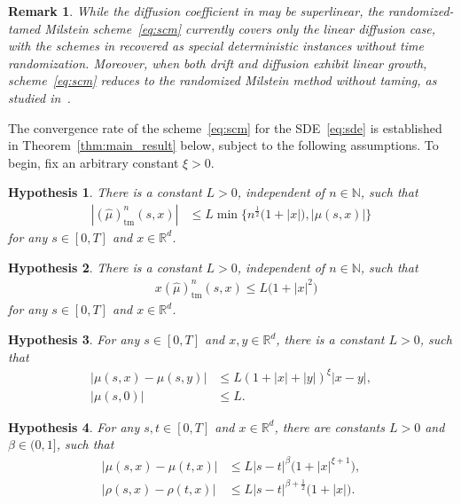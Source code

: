 \documentclass[reqno,  oneside, 12pt]{amsart}
\newtheorem{remark}{Remark}[section]
\newtheorem{asump}{Hypothesis}[section]
\begin{document}
\begin{remark}
	\sloppy
		While the diffusion coefficient in \cite{Kumar2020} may be superlinear, the randomized-tamed Milstein scheme~\eqref{eq:scm} currently covers only the linear diffusion case, with the schemes in \cite{Kumar2020} recovered as special deterministic instances without time randomization.
		Moreover, when both drift and diffusion exhibit linear growth, scheme~\eqref{eq:scm} reduces to the randomized Milstein method without taming, as studied in~\cite{Verena2024}.
\end{remark}




The convergence rate of the scheme~\eqref{eq:scm} for the SDE~\eqref{eq:sde} is established in Theorem~\ref{thm:main_result} below, subject to the following assumptions. To begin, fix an arbitrary constant $\xi > 0$.


\begin{asump} \label{asum:tame}
	There is
	a constant $L>0$, independent of $n\in\mathbb N$, such that 
	\begin{align*}
		|(\widehat{\mu})_{\mathrm{tm}}^{n}(s,x)|&\leq   L \min\big\{n^{\frac{1}{2}}\big(1+|x|\big),|\mu(s,x)|\big\}
	\end{align*}
	for any  $s\in[0,T]$ and $x\in\mathbb R^d$.
\end{asump}

\begin{asump} \label{asum:coercivity_scm}
	There is a constant \( L>0 \), independent of $n\in \mathbb N$, such that
	\begin{align*}
		& x(\widehat{\mu})_{\mathrm{tm}}^{n}(s,x)	 \leq L\big(1+|x|^2)
	\end{align*}
	for any $s\in[0,T]$ and $x\in\mathbb R^d$.
\end{asump}

\begin{asump} \label{asum:poly_lip_drift}
	For any $s\in[0, T]$ and $x, y\in\mathbb R^d$, there is a constant $L>0$,  such that 
	\begin{align*}
		|\mu(s,x)-\mu(s,y)|
		&\leq L \left(1+|x|+|y|\right)^{\xi}|x-y|,
		\\
		|\mu(s,0)|
		&\leq L.
	\end{align*}
\end{asump}







\begin{asump}  \label{asum:holder_time_diffusion_jump}
	For any  $s,t\in[0,T]$ and  $x\in\mathbb R^d$, there are    constants $L>0$ and $\beta\in (0,1]$,   such that
	\begin{align*}
		|{\mu}(s,x)-{\mu}(t,x)|&\leq L|s-t|^{\beta} \big(1+|x|^{\xi+1}\big),
		\\
		|{\rho}(s,x)-{\rho}(t,x)|&\leq L|s-t|^{\beta+\frac{1}{2}} \big(1+|x|\big).
	\end{align*}
\end{asump} 
\end{document}
